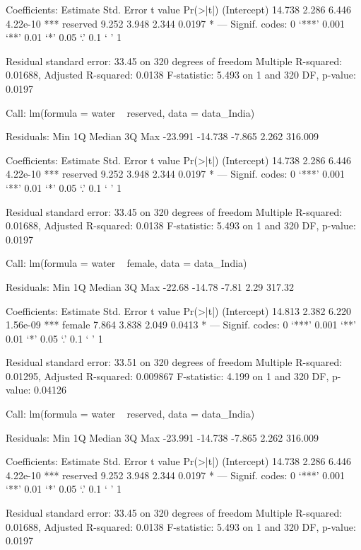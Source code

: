 Coefficients:
            Estimate Std. Error t value Pr(>|t|)    
(Intercept)   14.738      2.286   6.446 4.22e-10 ***
reserved       9.252      3.948   2.344   0.0197 *  
---
Signif. codes:  0 ‘***’ 0.001 ‘**’ 0.01 ‘*’ 0.05 ‘.’ 0.1 ‘ ’ 1

Residual standard error: 33.45 on 320 degrees of freedom
Multiple R-squared:  0.01688,	Adjusted R-squared:  0.0138 
F-statistic: 5.493 on 1 and 320 DF,  p-value: 0.0197


Call:
lm(formula = water ~ reserved, data = data_India)

Residuals:
    Min      1Q  Median      3Q     Max 
-23.991 -14.738  -7.865   2.262 316.009 

Coefficients:
            Estimate Std. Error t value Pr(>|t|)    
(Intercept)   14.738      2.286   6.446 4.22e-10 ***
reserved       9.252      3.948   2.344   0.0197 *  
---
Signif. codes:  0 ‘***’ 0.001 ‘**’ 0.01 ‘*’ 0.05 ‘.’ 0.1 ‘ ’ 1

Residual standard error: 33.45 on 320 degrees of freedom
Multiple R-squared:  0.01688,	Adjusted R-squared:  0.0138 
F-statistic: 5.493 on 1 and 320 DF,  p-value: 0.0197


Call:
lm(formula = water ~ female, data = data_India)

Residuals:
   Min     1Q Median     3Q    Max 
-22.68 -14.78  -7.81   2.29 317.32 

Coefficients:
            Estimate Std. Error t value Pr(>|t|)    
(Intercept)   14.813      2.382   6.220 1.56e-09 ***
female         7.864      3.838   2.049   0.0413 *  
---
Signif. codes:  0 ‘***’ 0.001 ‘**’ 0.01 ‘*’ 0.05 ‘.’ 0.1 ‘ ’ 1

Residual standard error: 33.51 on 320 degrees of freedom
Multiple R-squared:  0.01295,	Adjusted R-squared:  0.009867 
F-statistic: 4.199 on 1 and 320 DF,  p-value: 0.04126


Call:
lm(formula = water ~ reserved, data = data_India)

Residuals:
    Min      1Q  Median      3Q     Max 
-23.991 -14.738  -7.865   2.262 316.009 

Coefficients:
            Estimate Std. Error t value Pr(>|t|)    
(Intercept)   14.738      2.286   6.446 4.22e-10 ***
reserved       9.252      3.948   2.344   0.0197 *  
---
Signif. codes:  0 ‘***’ 0.001 ‘**’ 0.01 ‘*’ 0.05 ‘.’ 0.1 ‘ ’ 1

Residual standard error: 33.45 on 320 degrees of freedom
Multiple R-squared:  0.01688,	Adjusted R-squared:  0.0138 
F-statistic: 5.493 on 1 and 320 DF,  p-value: 0.0197


